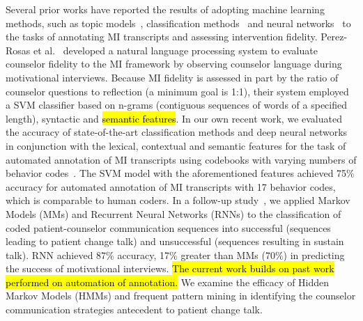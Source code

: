 Several prior works have reported the results of adopting machine learning methods, such as topic models~\cite{kotov2014towards, gaut2017content, imel2015computational, kotov2015interpretable, atkins2014scaling}, classification methods~\cite{hasan2016study, can2016sounds, perez2017predicting, perez2017understanding} and neural networks~\cite{hasan2016study, tanana2015recursive, tanana2016comparison} to the tasks of annotating MI transcripts and assessing intervention fidelity. Perez-Rosas et al.~\cite{perez2017predicting} developed a natural language processing system to evaluate counselor fidelity to the MI framework by observing counselor language during motivational interviews. Because MI fidelity is assessed in part by the ratio of counselor questions to reflection (a minimum goal is 1:1), their system employed a SVM classifier based on n-grams (contiguous sequences of words of a specified length), syntactic and \hl{semantic features}. In our own recent work, we evaluated the accuracy of state-of-the-art classification methods and deep neural networks in conjunction with the lexical, contextual and semantic features for the task of automated annotation of MI transcripts using codebooks with varying numbers of behavior codes~\cite{hasan2016study}. The SVM model with the aforementioned features achieved 75\% accuracy for automated annotation of MI transcripts with 17 behavior codes, which is comparable to human coders. In a follow-up study~\cite{hasan2018predicting}, we applied Markov Models (MMs) and Recurrent Neural Networks (RNNs) to the classification of coded patient-counselor communication sequences into successful (sequences leading to patient change talk) and unsuccessful (sequences resulting in sustain talk). RNN achieved 87\% accuracy, 17\% greater than MMs (70\%) in predicting the success of motivational interviews. \hl{The current work builds on past work performed on automation of annotation.} We examine the efficacy of Hidden Markov Models (HMMs) and frequent pattern mining in identifying the counselor communication strategies antecedent to patient change talk.

